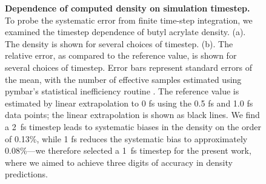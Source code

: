 \documentclass[aps,pre,twocolumn,nofootinbib,superscriptaddress,linenumbers]{revtex4-1}
\begin{document}
\begin{figure}


\caption{
{\bf Dependence of computed density on simulation timestep.}
To probe the systematic error from finite time-step integration, we examined the timestep dependence of butyl acrylate density.  
(a).  The density is shown for several choices of timestep.  
(b).  The relative error, as compared to the reference value, is shown for several choices of timestep.  
Error bars represent standard errors of the mean, with the number of effective samples estimated using pymbar's statistical inefficiency routine \cite{shirts2008statistically}.  
The reference value is estimated by linear extrapolation to 0 fs using the 0.5 fs and 1.0 fs data points; the linear extrapolation is shown as black lines.  
We find a 2~fs timestep leads to systematic biases in the density on the order of 0.13\%, while 1 fs reduces the systematic bias to approximately 0.08\%---we therefore selected a 1~fs timestep for the present work, where we aimed to achieve three digits of accuracy in density predictions.
}
\label{figure:timestep}

\end{figure}
\end{document}
